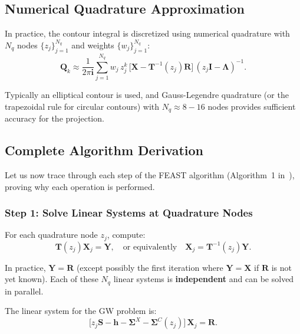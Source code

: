 \documentclass[12pt,a4paper]{article}
\theoremstyle{definition}
\begin{document}
\subsection{Numerical Quadrature Approximation}

In practice, the contour integral is discretized using numerical quadrature with $N_q$ nodes $\{z_j\}_{j=1}^{N_q}$ and weights $\{w_j\}_{j=1}^{N_q}$:
\begin{equation}\label{eq:Qk_quad}
\boxed{\mathbf{Q}_k \approx \frac{1}{2\pi\mathbf{i}} \sum_{j=1}^{N_q} w_j\,z_j^{k}\,\bigl[\mathbf{X} - \mathbf{T}^{-1}(z_j)\mathbf{R}\bigr]\,(z_j\mathbf{I} - \mathbf{\Lambda})^{-1}}.
\end{equation}

Typically an elliptical contour is used, and Gauss-Legendre quadrature (or the trapezoidal rule for circular contours) with $N_q \approx 8{-}16$ nodes provides sufficient accuracy for the projection.

\subsection{Complete Algorithm Derivation}

Let us now trace through each step of the FEAST algorithm (Algorithm~1 in~\cite{Li2025}), proving why each operation is performed.

\subsubsection*{Step 1: Solve Linear Systems at Quadrature Nodes}

For each quadrature node $z_j$, compute:
\begin{equation}\label{eq:linear_systems}
\mathbf{T}(z_j)\mathbf{X}_j = \mathbf{Y}, \quad \text{or equivalently} \quad \mathbf{X}_j = \mathbf{T}^{-1}(z_j)\mathbf{Y}.
\end{equation}

In practice, $\mathbf{Y} = \mathbf{R}$ (except possibly the first iteration where $\mathbf{Y} = \mathbf{X}$ if $\mathbf{R}$ is not yet known). Each of these $N_q$ linear systems is \textbf{independent} and can be solved in parallel.

The linear system for the GW problem is:
\begin{equation}\label{eq:gw_linear_system}
\bigl[z_j\mathbf{S} - \mathbf{h} - \mathbf{\Sigma}^{X} - \mathbf{\Sigma}^{C}(z_j)\bigr]\,\mathbf{X}_j = \mathbf{R}.
\end{equation}
\end{document}
